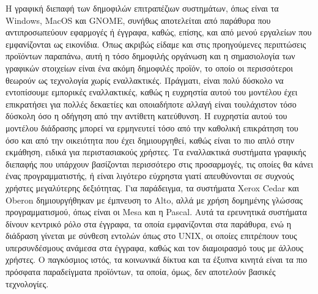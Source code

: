 \documentclass[
]{article}
\begin{document}
Η γραφική διεπαφή των δημοφιλών επιτραπέζιων συστημάτων, όπως είναι τα
Windows, MacOS και GNOME, συνήθως αποτελείται από παράθυρα που
αντιπροσωπεύουν εφαρμογές ή έγγραφα, καθώς, επίσης, και από μενού
εργαλείων που εμφανίζονται ως εικονίδια. Όπως ακριβώς είδαμε και στις
προηγούμενες περιπτώσεις προϊόντων παραπάνω, αυτή η τόσο δημοφιλής
οργάνωση και η σημασιολογία των γραφικών στοιχείων είναι ένα ακόμη
δημοφιλές προϊόν, το οποίο οι περισσότεροι θεωρούν ως τεχνολογία χωρίς
εναλλακτικές. Πράγματι, είναι πολύ δύσκολο να εντοπίσουμε εμπορικές
εναλλακτικές, καθώς η ευχρηστία αυτού του μοντέλου έχει επικρατήσει για
πολλές δεκαετίες και οποιαδήποτε αλλαγή είναι τουλάχιστον τόσο δύσκολη
όσο η οδήγηση από την αντίθετη κατεύθυνση. Η ευχρηστία αυτού του
μοντέλου διάδρασης μπορεί να ερμηνευτεί τόσο από την καθολική επικράτηση
του όσο και από την οικειότητα που έχει δημιουργηθεί, καθώς είναι το πιο
απλό στην εκμάθηση, ειδικά για περιστασιακούς χρήστες. Τα εναλλακτικά
συστήματα γραφικής διεπαφής που υπάρχουν βασίζονται περισσότερο στις
προσαρμογές, τις οποίες θα κάνει ένας προγραμματιστής, ή είναι λιγότερο
εύχρηστα γιατί απευθύνονται σε συχνούς χρήστες μεγαλύτερης δεξιότητας.
Για παράδειγμα, τα συστήματα Xerox Cedar και Oberon δημιουργήθηκαν με
έμπνευση το Alto, αλλά με χρήση δομημένης γλώσσας προγραμματισμού, όπως
είναι οι Mesa και η Pascal. Αυτά τα ερευνητικά συστήματα δίνουν κεντρικό
ρόλο στα έγγραφα, τα οποία εμφανίζονται στα παράθυρα, ενώ η διάδραση
γίνεται με σύνθεση εντολών όπως στο UNIX, οι οποίες επιτρέπουν τους
υπερσυνδέσμους ανάμεσα στα έγγραφα, καθώς και τον διαμοιρασμό τους με
άλλους χρήστες. Ο παγκόσμιος ιστός, τα κοινωνικά δίκτυα και τα έξυπνα
κινητά είναι τα πιο πρόσφατα παραδείγματα προϊόντων, τα οποία, όμως, δεν
αποτελούν βασικές τεχνολογίες.
\end{document}
